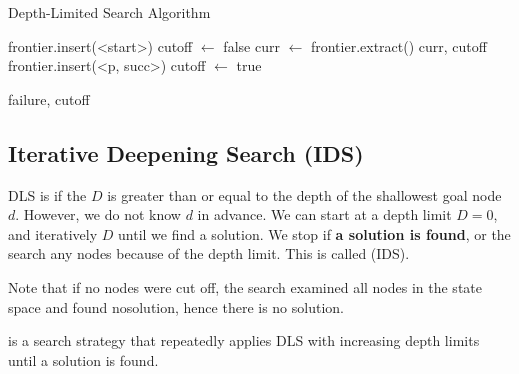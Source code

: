\begin{algorithm}[ht!]
    \caption{Depth-Limited Search Algorithm}
    \begin{algorithmic}[1]
            \State frontier.insert(<start>)
            \State cutoff $\gets$ false
                \State curr $\gets$ frontier.extract()
                    \State \Return curr, cutoff 
                        \State frontier.insert(<p, succ>)
                    \EndFor
                \Else
                    \State cutoff $\gets$ true
                \EndIf
            \EndWhile

            \State \Return failure, cutoff
        \EndFunction
    \end{algorithmic}
\end{algorithm}

\subsection{Iterative Deepening Search (IDS)}

DLS is  if the  $D$ is greater than or equal to the depth of the shallowest goal node $d$. However, we do not know $d$ in advance. We can start at a depth limit $D = 0$, and iteratively  $D$ until we find a solution. We stop if {\color{darkGreen}\textbf{a solution is found}}, or the search  any nodes because of the depth limit. This is called  (IDS).

Note that if no nodes were cut off, the search examined all nodes in the state space and found nosolution, hence there is no solution.

\begin{definition}\label{def:ids}
     is a search strategy that repeatedly applies DLS with increasing depth limits until a solution is found.
\end{definition}

